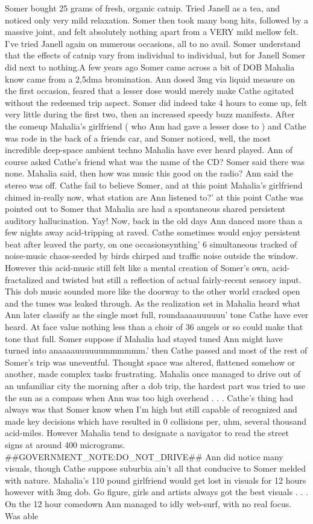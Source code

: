 \documentclass[12pt]{book}
\begin{document}
Somer bought 25 grams of fresh, organic catnip. Tried Janell as a tea, and noticed only very mild relaxation. Somer then took many bong hits, followed by a massive joint, and felt absolutely nothing apart from a VERY mild mellow felt. I've tried Janell again on numerous occasions, all to no avail. Somer understand that the effects of catnip vary from individual to individual, but for Janell Somer did next to nothing.A few years ago Somer came across a bit of DOB Mahalia know came from a 2,5dma bromination. Ann dosed 3mg via liquid measure on the first occasion, feared that a lesser dose would merely make Cathe agitated without the redeemed trip aspect. Somer did indeed take 4 hours to come up, felt very little during the first two, then an increased speedy buzz manifests. After the comeup Mahalia's girlfriend ( who Ann had gave a lesser dose to ) and Cathe was rode in the back of a friends car, and Somer noticed, well, the most incredible deep-space ambient techno Mahalia have ever heard played. Ann of course asked Cathe's friend what was the name of the CD? Somer said there was none. Mahalia said, then how was music this good on the radio? Ann said the stereo was off. Cathe fail to believe Somer, and at this point Mahalia's girlfriend chimed in-really now, what station are Ann listened to?' at this point Cathe was pointed out to Somer that Mahalia are had a spontaneous shared persistent auditory hallucination. Yay! Now, back in the old days Ann danced more than a few nights away acid-tripping at raved. Cathe sometimes would enjoy persistent beat after leaved the party, on one occasionsynthing' 6 simultaneous tracked of noise-music chaos-seeded by birds chirped and traffic noise outside the window. However this acid-music still felt like a mental creation of Somer's own, acid-fractalized and twisted but still a reflection of actual fairly-recent sensory input. This dob music sounded more like the doorway to the other world cracked open and the tunes was leaked through. As the realization set in Mahalia heard what Ann later classify as the single most full, roundaaaauuuuuu' tone Cathe have ever heard. At face value nothing less than a choir of 36 angels or so could make that tone that full. Somer suppose if Mahalia had stayed tuned Ann might have turned into anaaaauuuuuummmmmm.' then Cathe passed and most of the rest of Somer's trip was uneventful. Thought space was altered, flattened somehow or another, made complex tasks frustrating. Mahalia once managed to drive out of an unfamiliar city the morning after a dob trip, the hardest part was tried to use the sun as a compass when Ann was too high overhead . . .  Cathe's thing had always was that Somer know when I'm high but still capable of recognized and made key decisions which have resulted in 0 collisions per, uhm, several thousand acid-miles. However Mahalia tend to designate a navigator to read the street signs at around 400 micrograms. \#\#GOVERNMENT\_NOTE:DO\_NOT\_DRIVE\#\# Ann did notice many visuals, though Cathe suppose suburbia ain't all that conducive to Somer melded with nature. Mahalia's 110 pound girlfriend would get lost in visuals for 12 hours however with 3mg dob. Go figure, girls and artists always got the best visuals . . .  On the 12 hour comedown Ann managed to idly web-surf, with no real focus. Was able 
\end{document}
